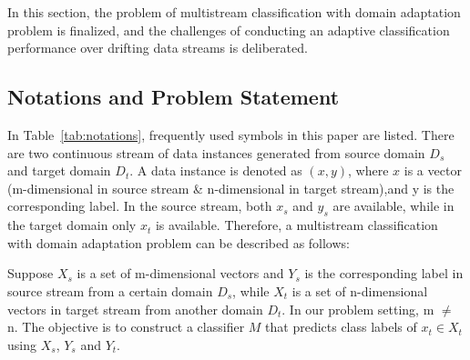 In this section, the problem of multistream classification with domain adaptation problem is finalized, and the challenges of conducting an adaptive classification performance over drifting data streams is deliberated.

\subsection{Notations and Problem Statement}
\label{subsec: problemstatement}

In Table~\ref{tab:notations}, frequently used symbols in this paper are listed. There are two 
continuous stream of data instances generated from source domain $D_{s}$ and target domain $D_{t}$.
A data instance is denoted as $(x, y)$, where $x$ is a vector (m-dimensional in 
source stream \& n-dimensional in target stream),and y is the 
corresponding label. In the source stream, both $x_{s}$ and $y_{s}$  are available, while in the target domain only $x_{t}$ is available. Therefore, a multistream classification with domain adaptation problem can be described as follows:

Suppose $X_{s}$ is a set of m-dimensional vectors and $Y_{s}$ is the corresponding label in source stream from a certain domain $D_{s}$, 
while $X_{t}$ is a set of n-dimensional vectors in target stream from another 
domain $D_{t}$. In our problem setting, m $\neq$ n. The objective is to construct a classifier $M$ that
predicts class labels of $x_{t} \in X_{t}$ using $X_{s}$, $Y_{s}$ and $Y_{t}$.

